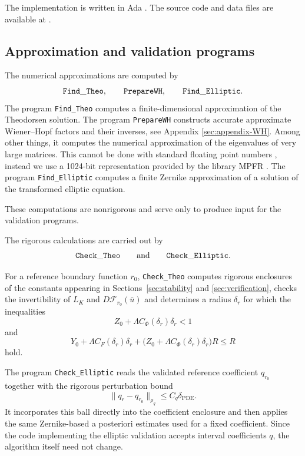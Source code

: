 \documentclass[11pt,a4paper]{amsart}
\begin{document}
The implementation is written in Ada \cite{Ada,Gnat}. The source code and
data files are available at \cite{program}.


\subsection{Approximation and validation programs}

The numerical approximations are computed by
\[
{\tt Find\_Theo},
\qquad
{\tt PrepareWH},
\qquad
{\tt Find\_Elliptic}.
\]
The program {\tt Find\_Theo} computes a finite-dimensional
approximation of the Theodorsen solution. The program
{\tt PrepareWH} constructs accurate approximate Wiener--Hopf factors
and their inverses, see Appendix \ref{sec:appendix-WH}. Among other things, it computes the numerical approximation of the eigenvalues of very large matrices. This cannot be done with standard floating point numbers \cite{IEEE}, instead we use a 1024-bit representation provided by the library MPFR \cite{MPFR}. The program {\tt Find\_Elliptic} computes a finite
Zernike approximation of a solution of the transformed elliptic
equation.

These computations are nonrigorous and serve only to produce input
for the validation programs.

The rigorous calculations are carried out by
\[
{\tt Check\_Theo}
\qquad\text{and}\qquad
{\tt Check\_Elliptic}.
\]

For a reference boundary function $r_0$, {\tt Check\_Theo} computes
rigorous enclosures of the constants appearing in Sections~\ref{sec:stability} and
\ref{sec:verification}, checks the invertibility of $L_K$ and $D\mathcal F_{r_0}(\bar u)$ and determines a radius $\delta_r$ for which
the inequalities
\[
Z_0+\Lambda C_\Phi(\delta_r)\delta_r<1
\]
and
\[
Y_0
+
\Lambda C_F(\delta_r)\delta_r
+
\bigl(
Z_0+\Lambda C_\Phi(\delta_r)\delta_r
\bigr)R
\le R
\]
hold.

The program {\tt Check\_Elliptic} reads the validated reference
coefficient $q_{r_0}$ together with the rigorous perturbation bound
\[
\|q_r-q_{r_0}\|_{\rho_q}
\le
C_q\delta_{\mathrm{PDE}}.
\]
It incorporates this ball directly into the coefficient enclosure and
then applies the same Zernike-based a posteriori estimates used for a
fixed coefficient. Since the code implementing the elliptic validation accepts interval coefficients \(q\), the algorithm itself need not change.
\end{document}
